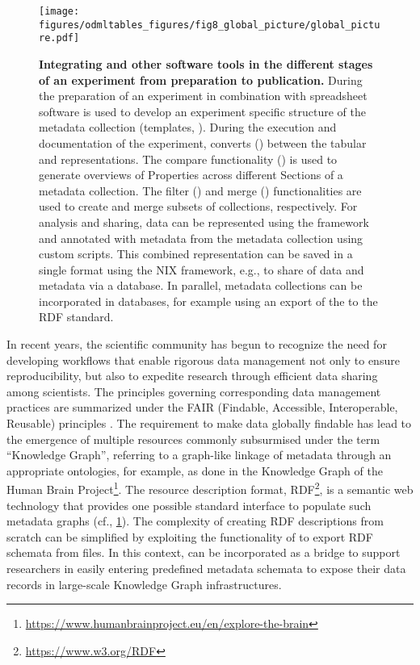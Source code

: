 \begin{figure}[!ht]
\begin{center}
\texttt{[image: figures/odmltables\_figures/fig8\_global\_picture/global\_picture.pdf]}
\caption[Integrating  and other software tools in the different stages of an experiment from preparation to publication]{\label{fig:global_workflow}
\textbf{Integrating  and other software tools in the different stages of an experiment from preparation to publication.} During the preparation of an experiment  in combination with spreadsheet software is used to develop an experiment specific structure of the metadata collection (templates, \fgenerate{}). During the execution and documentation of the experiment,  converts (\fconvert{}) between the tabular and  representations. The compare functionality (\fcompare{}) is used to generate overviews of  Properties across different Sections of a metadata collection. The filter (\ffilter{}) and merge (\fmerge{}) functionalities are used to create and merge subsets of  collections, respectively. For analysis and sharing, data can be represented using the  framework and annotated with metadata from the  metadata collection using custom scripts. This combined representation can be saved in a single format using the NIX framework, e.g., to share of data and metadata via a database. In parallel, metadata collections can be incorporated in databases, for example using an export of the  to the RDF standard.}
\end{center}
\end{figure}

In recent years, the scientific community has begun to recognize the need for developing workflows that enable rigorous data management not only to ensure reproducibility, but also to expedite research through efficient data sharing among scientists. The principles governing corresponding data management practices are summarized under the FAIR (Findable, Accessible, Interoperable, Reusable) principles \citep{Wilkinson_2016}. The requirement to make data globally findable has lead to the emergence of multiple resources commonly subsurmised under the term ``Knowledge Graph'', referring to a graph-like linkage of metadata through an appropriate ontologies, for example, as done in the Knowledge Graph of the Human Brain Project\footnote{\url{https://www.humanbrainproject.eu/en/explore-the-brain}}. The resource description format, RDF\footnote{\url{https://www.w3.org/RDF}}, is a semantic web technology that provides one possible standard interface to populate such metadata graphs (cf., \cref{fig:global_workflow}). The complexity of creating RDF descriptions from scratch can be simplified by exploiting the functionality of  to export RDF schemata from  files. In this context,  can be incorporated as a bridge to support researchers in easily entering predefined metadata schemata to expose their data records in large-scale Knowledge Graph infrastructures.

